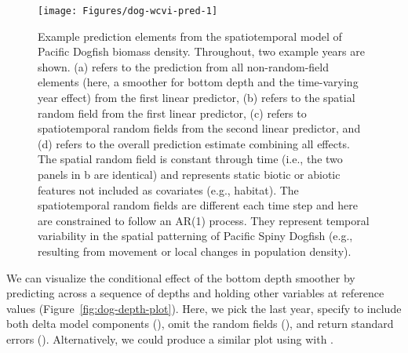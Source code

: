 \documentclass[article]{jss}\usepackage[]{graphicx}\usepackage[dvipsnames]{xcolor}
\newcommand{\fct}[1]{\code{#1()}}
\begin{document}
\begin{Schunk}
\begin{figure}[ht]

{\centering \texttt{[image: Figures/dog-wcvi-pred-1]}

}

\caption[Example prediction elements from the spatiotemporal model of Pacific Dogfish biomass density]{Example prediction elements from the spatiotemporal model of Pacific Dogfish biomass density. Throughout, two example years are shown. (a)  refers to the prediction from all non-random-field elements (here, a smoother for bottom depth and the time-varying year effect) from the first linear predictor, (b)  refers to the spatial random field from the first linear predictor, (c)  refers to spatiotemporal random fields from the second linear predictor, and (d)  refers to the overall prediction estimate combining all effects. The spatial random field is constant through time (i.e., the two panels in b are identical) and represents static biotic or abiotic features not included as covariates (e.g., habitat). The spatiotemporal random fields are different each time step and here are constrained to follow an AR(1) process. They represent temporal variability in the spatial patterning of Pacific Spiny Dogfish (e.g., resulting from movement or local changes in population density).}\label{fig:dog-wcvi-pred}
\end{figure}
\end{Schunk}

We can visualize the conditional effect of the bottom depth smoother by predicting across a sequence of depths and holding other variables at reference values (Figure~\ref{fig:dog-depth-plot}).
Here, we pick the last year, specify to include both delta model components (), omit the random fields (), and return standard errors ().
Alternatively, we could produce a similar plot using  \citep{ggeffects} with \fct{ggeffects::ggpredict}.

\begin{Schunk}
\end{Schunk}
\end{document}
